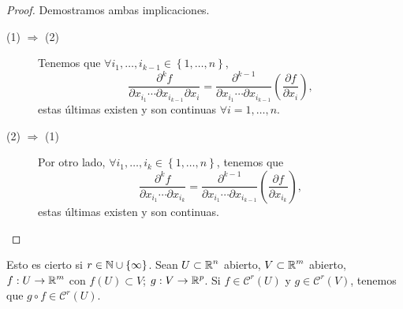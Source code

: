 \begin{proof}Demostramos ambas implicaciones.
\begin{description} 
	\item[(1) $\displaystyle \Rightarrow $ (2)] Tenemos que $\displaystyle \forall i_{1}, \ldots, i_{k-1} \in \left\{ 1, \ldots, n\right\}  $,
		\[\frac{\partial^{k}f}{\partial x_{i_{1}} \cdots \partial x_{i_{k-1}}\partial x_{i}} = \frac{\partial ^{k-1}}{\partial x_{i_{1}} \cdots \partial x_{i_{k-1}}}\left(\frac{\partial f}{\partial x_{i}}\right) ,\]
estas últimas existen y son continuas $\displaystyle \forall i = 1, \ldots, n $.
\item[(2) $\displaystyle \Rightarrow $ (1)] Por otro lado, $\displaystyle \forall i_{1}, \ldots, i_{k} \in \left\{ 1, \ldots, n\right\}  $, tenemos que 
	\[\frac{\partial^{k}f}{\partial x_{i_{1}} \cdots \partial x_{i_{k}}} = \frac{\partial ^{k-1}}{\partial x_{i_{1}} \cdots \partial x_{i_{k-1}}}\left(\frac{\partial f}{\partial x_{i_{k}}}\right) ,\]
estas últimas existen y son continuas.	
\end{description}
\end{proof}
\begin{theorem}
	Esto es cierto si $\displaystyle r \in \mathbb{N} \cup \left\{ \infty\right\}  $. Sean $\displaystyle U \subset \mathbb{R}^{n} $ abierto, $\displaystyle V \subset \mathbb{R}^{m} $ abierto, $\displaystyle f : U \to \mathbb{R}^{m} $ con $\displaystyle f\left(U\right) \subset V $; $\displaystyle g : V \to \mathbb{R}^{p} $. 
	Si $\displaystyle f \in \mathcal{C}^{r}\left(U\right)$ y $\displaystyle g \in \mathcal{C}^{r}\left(V\right) $, tenemos que $\displaystyle g\circ f \in \mathcal{C}^{r}\left(U\right) $.
\end{theorem}
